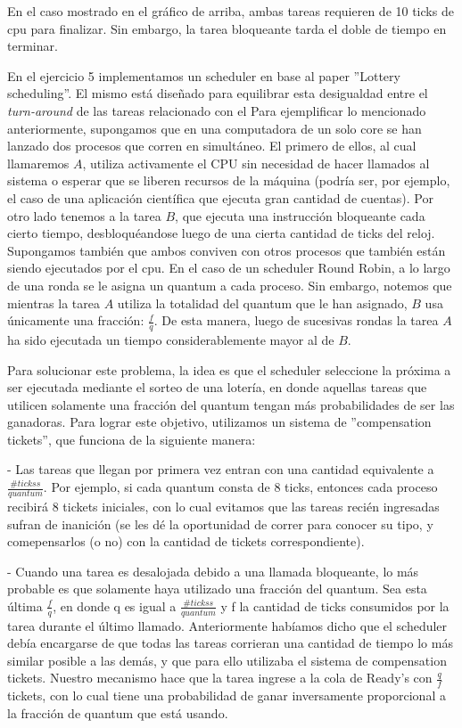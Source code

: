 En el caso mostrado en el gráfico de arriba, ambas tareas requieren de 10 ticks de cpu para finalizar. Sin embargo, la tarea bloqueante tarda el doble de tiempo en terminar. 

En el ejercicio 5 implementamos un scheduler en base al paper ''Lottery scheduling''. El mismo está diseñado para equilibrar esta desigualdad entre el \emph{turn-around} de las tareas relacionado con el
Para ejemplificar lo mencionado anteriormente, supongamos que en una computadora de un solo core se han lanzado dos procesos que corren en simultáneo. El primero de ellos, al cual llamaremos $A$, utiliza
activamente el CPU sin necesidad de hacer llamados al sistema o esperar que se liberen recursos de la máquina (podría ser, por ejemplo, el caso de una aplicación científica que ejecuta gran cantidad de 
cuentas). Por otro lado tenemos a la tarea $B$, que ejecuta una instrucción bloqueante cada cierto tiempo, desbloquéandose luego de una cierta cantidad de ticks del reloj. Supongamos también que ambos conviven
con otros procesos que también están siendo ejecutados por el cpu. En el caso de un scheduler Round Robin, a lo largo de una ronda se le asigna un quantum a cada proceso. Sin embargo, notemos que mientras
la tarea $A$ utiliza la totalidad del quantum que le han asignado, $B$ usa únicamente una fracción: $\frac{f}{q}$. De esta manera, luego de sucesivas rondas la tarea $A$ ha sido ejecutada un tiempo
considerablemente mayor al de $B$.

Para solucionar este problema, la idea es que el scheduler seleccione la próxima a ser ejecutada mediante el sorteo de una lotería, en donde aquellas tareas que utilicen solamente una fracción del quantum
tengan más probabilidades de ser las ganadoras. Para lograr este objetivo, utilizamos un sistema de ''compensation tickets'', que funciona de la siguiente manera:

- Las tareas que llegan por primera vez entran con una cantidad equivalente a $\frac{\#tickss}{quantum}$. Por ejemplo, si cada quantum consta de 8 ticks, entonces cada
proceso recibirá 8 tickets iniciales, con lo cual evitamos que las tareas recién ingresadas sufran de inanición (se les dé la oportunidad de correr para conocer su tipo, 
y comepensarlos (o no) con la cantidad de tickets correspondiente).

- Cuando una tarea es desalojada debido a una llamada bloqueante, lo más probable es que solamente haya utilizado una fracción del quantum. Sea esta última $\frac{f}{q}$,
en donde q es igual a $\frac{\#tickss}{quantum}$ y f la cantidad de ticks consumidos por la tarea durante el último llamado.
Anteriormente habíamos dicho que el scheduler debía encargarse de que todas las tareas corrieran una cantidad de tiempo lo más similar posible a las demás, y que para ello utilizaba
el sistema de compensation tickets. Nuestro mecanismo hace que la tarea ingrese a la cola de Ready's con $\frac{q}{f}$ tickets, con lo cual tiene una probabilidad de ganar
inversamente proporcional a la fracción de quantum que está usando.


